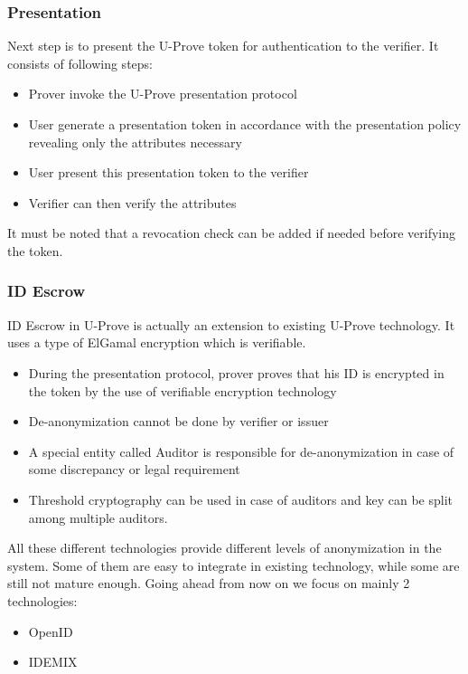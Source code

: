 \subsubsection{Presentation}
Next step is to present the U-Prove token for authentication to the verifier. It consists of following steps:
\begin{itemize}
	\item Prover invoke the U-Prove presentation protocol
	\item User generate a presentation token in accordance with the presentation policy revealing only the attributes necessary
	\item User present this presentation token to the verifier
	\item Verifier can then verify the attributes
\end{itemize}
It must be noted that a revocation check can be added if needed before verifying the token.
\subsubsection{ID Escrow}
ID Escrow in U-Prove is actually an extension\cite{zaverucha2013u} to existing U-Prove technology. It uses a type of ElGamal encryption which is verifiable.
\begin{itemize}
	\item  During the presentation protocol, prover proves that his ID is encrypted in the token by the use of verifiable encryption\cite{VE} technology
	\item De-anonymization cannot be done by verifier or issuer
	\item A special entity called Auditor is responsible for de-anonymization in case of some discrepancy or legal requirement
	\item Threshold cryptography can be used in case of auditors and key can be split among multiple auditors.
\end{itemize}

All these different technologies provide different levels of anonymization\cite{goldberg2000pseudonymous} in the system. Some of them are easy to integrate in existing technology, while some are still not mature enough. Going ahead from now on we focus on mainly 2 technologies:
\begin{itemize}
	\item OpenID
	\item IDEMIX
\end{itemize}